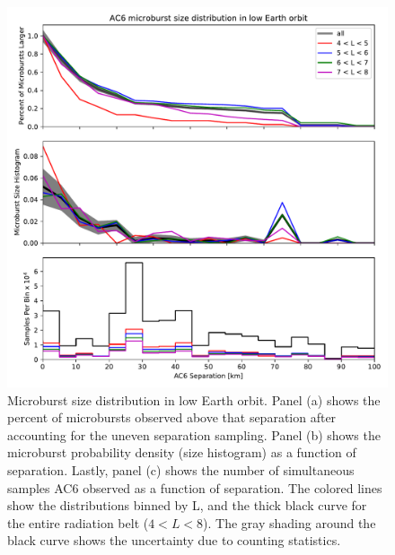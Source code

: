 \documentclass[draft]{agujournal2019}
\begin{document}
\begin{figure}
\includegraphics[width=\textwidth]{fig3.pdf}
\caption{Microburst size distribution in low Earth orbit. Panel (a) shows the percent of microbursts observed above that separation after accounting for the uneven separation sampling. Panel (b) shows the microburst probability density (size histogram) as a function of separation. Lastly, panel (c) shows the number of simultaneous samples AC6 observed as a function of separation. The colored lines show the distributions binned by L, and the thick black curve for the entire radiation belt ($4 < L < 8$). The gray shading around the black curve shows the uncertainty due to counting statistics.}
\label{fig3}
\end{figure}
\end{document}
